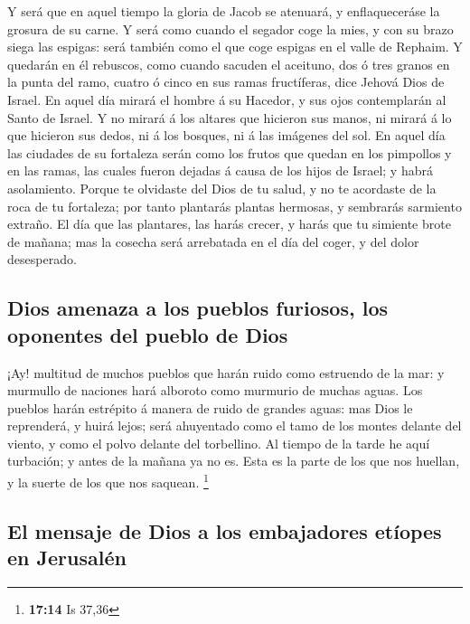  Y será que en aquel tiempo la gloria de Jacob se
atenuará, y enflaqueceráse la grosura de su carne.  Y será
como cuando el segador coge la mies, y con su brazo siega las espigas:
será también como el que coge espigas en el valle de Rephaim.
 Y quedarán en él rebuscos, como cuando sacuden el
aceituno, dos ó tres granos en la punta del ramo, cuatro ó cinco en sus
ramas fructíferas, dice Jehová Dios de Israel.  En aquel
día mirará el hombre á su Hacedor, y sus ojos contemplarán al Santo de
Israel.  Y no mirará á los altares que hicieron sus manos,
ni mirará á lo que hicieron sus dedos, ni á los bosques, ni á las
imágenes del sol.  En aquel día las ciudades de su
fortaleza serán como los frutos que quedan en los pimpollos y en las
ramas, las cuales fueron dejadas á causa de los hijos de Israel; y habrá
asolamiento.  Porque te olvidaste del Dios de tu salud, y
no te acordaste de la roca de tu fortaleza; por tanto plantarás plantas
hermosas, y sembrarás sarmiento extraño.  El día que las
plantares, las harás crecer, y harás que tu simiente brote de mañana;
mas la cosecha será arrebatada en el día del coger, y del dolor
desesperado.

\hypertarget{dios-amenaza-a-los-pueblos-furiosos-los-oponentes-del-pueblo-de-dios}{%
\subsection{Dios amenaza a los pueblos furiosos, los oponentes del
pueblo de
Dios}\label{dios-amenaza-a-los-pueblos-furiosos-los-oponentes-del-pueblo-de-dios}}

 ¡Ay! multitud de muchos pueblos que harán ruido como
estruendo de la mar: y murmullo de naciones hará alboroto como murmurio
de muchas aguas.  Los pueblos harán estrépito á manera de
ruido de grandes aguas: mas Dios le reprenderá, y huirá lejos; será
ahuyentado como el tamo de los montes delante del viento, y como el
polvo delante del torbellino.  Al tiempo de la tarde he
aquí turbación; y antes de la mañana ya no es. Esta es la parte de los
que nos huellan, y la suerte de los que nos saquean. \footnote{\textbf{17:14}
  Is 37,36}

\hypertarget{el-mensaje-de-dios-a-los-embajadores-etuxedopes-en-jerusaluxe9n}{%
\subsection{El mensaje de Dios a los embajadores etíopes en
Jerusalén}\label{el-mensaje-de-dios-a-los-embajadores-etuxedopes-en-jerusaluxe9n}}

